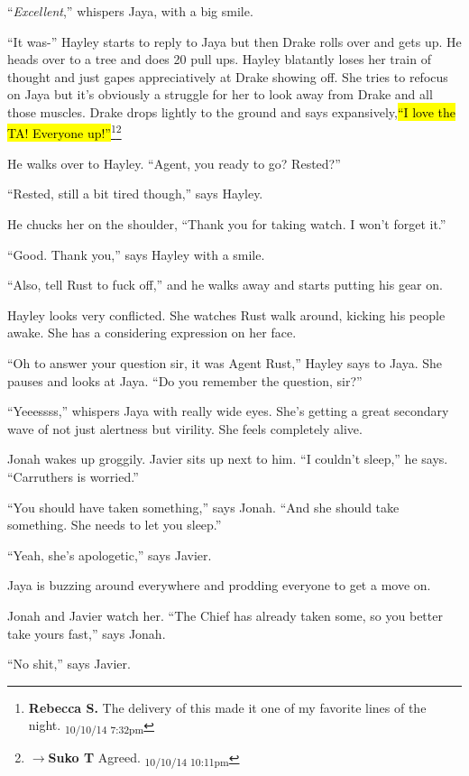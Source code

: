 ``\textit{Excellent},'' whispers Jaya, with a big smile.

``It was-'' Hayley starts to reply to Jaya but then Drake rolls over and gets up.  He heads over to a tree and does 20 pull ups.  Hayley blatantly loses her train of thought and just gapes appreciatively at Drake showing off.  She tries to refocus on Jaya but it's obviously a struggle for her to look away from Drake and all those muscles.  Drake drops lightly to the ground and says expansively,\hl{``I love the TA!  Everyone up!''}\footnote{\textbf{Rebecca S. }The delivery of this made it one of my favorite lines of the night. \textsubscript{10/10/14 7:32pm}}\footnote{$\rightarrow$\textbf{Suko T }Agreed. \textsubscript{10/10/14 10:11pm}}

He walks over to Hayley.  ``Agent, you ready to go?  Rested?''

``Rested, still a bit tired though,'' says Hayley.

He chucks her on the shoulder,  ``Thank you for taking watch. I won't forget it.''

``Good.  Thank you,'' says Hayley with a smile.

``Also, tell Rust to fuck off,'' and he walks away and starts putting his gear on.

Hayley looks very conflicted.  She watches Rust walk around, kicking his people awake.  She has a considering expression on her face.

``Oh to answer your question sir, it was Agent Rust,'' Hayley says to Jaya.  She pauses and looks at Jaya.  ``Do you remember the question, sir?''

``Yeeessss,'' whispers Jaya with really wide eyes.  She's getting a great secondary wave of not just alertness but virility.  She feels completely alive.



Jonah wakes up groggily.  Javier sits up next to him.  ``I couldn't sleep,'' he says.  ``Carruthers is worried.''

``You should have taken something,'' says Jonah.  ``And she should take something.  She needs to let you sleep.''

``Yeah, she's apologetic,'' says Javier.

Jaya is buzzing around everywhere and prodding everyone to get a move on.

Jonah and Javier watch her.  ``The Chief has already taken some, so you better take yours fast,'' says Jonah.

``No shit,'' says Javier.  

